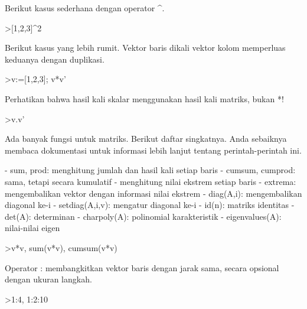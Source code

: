 \documentclass[a4paper,10pt]{article}
\begin{document}
\begin{eulernotebook}
\begin{euleroutput}
  Berikut kasus sederhana dengan operator ^.
  
\end{euleroutput}
\begin{eulerprompt}
>[1,2,3]^2
\end{eulerprompt}
\begin{euleroutput}
  
  Berikut kasus yang lebih rumit. Vektor baris dikali vektor kolom memperluas keduanya dengan duplikasi.
  
\end{euleroutput}
\begin{eulerprompt}
>v:=[1,2,3]; v*v'
\end{eulerprompt}
\begin{euleroutput}
  
  Perhatikan bahwa hasil kali skalar menggunakan hasil kali matriks, bukan *!
  
\end{euleroutput}
\begin{eulerprompt}
>v.v'
\end{eulerprompt}
\begin{euleroutput}
  
  Ada banyak fungsi untuk matriks. Berikut daftar singkatnya. Anda sebaiknya membaca dokumentasi untuk informasi lebih lanjut tentang perintah-perintah ini.
  
  - sum, prod: menghitung jumlah dan hasil kali setiap baris
  - cumsum, cumprod: sama, tetapi secara kumulatif
  - menghitung nilai ekstrem setiap baris
  - extrema: mengembalikan vektor dengan informasi nilai ekstrem
  - diag(A,i): mengembalikan diagonal ke-i
  - setdiag(A,i,v): mengatur diagonal ke-i
  - id(n): matriks identitas
  - det(A): determinan
  - charpoly(A): polinomial karakteristik
  - eigenvalues(A): nilai-nilai eigen
  
\end{euleroutput}
\begin{eulerprompt}
>v*v, sum(v*v), cumsum(v*v)
\end{eulerprompt}
\begin{euleroutput}
  
  Operator : membangkitkan vektor baris dengan jarak sama, secara opsional dengan ukuran langkah.
  
\end{euleroutput}
\begin{eulerprompt}
>1:4, 1:2:10
\end{eulerprompt}
\begin{euleroutput}
  

\end{euleroutput}
\end{eulernotebook}
\end{document}
